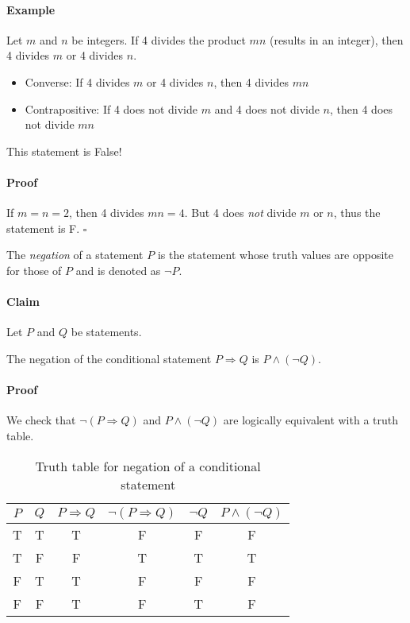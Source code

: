 \documentclass[../main.tex]{subfiles}
\begin{document}
\paragraph{Example}

Let $m$ and $n$ be integers. If 4 divides the product $mn$ (results in an integer),
then 4 divides $m$ or 4 divides $n$.

\begin{itemize}
    \item Converse: If 4 divides $m$ or 4 divides $n$, then 4 divides $mn$
    \item Contrapositive: If 4 does not divide $m$ and 4 does not divide $n$, then 4 does not divide $mn$
\end{itemize}

This statement is False!

\paragraph{Proof}

If $m = n = 2$, then 4 divides $mn = 4$. But 4 does \emph{not} divide $m$ or $n$, thus the 
statement is F. $\square$

The \emph{negation} of a statement $P$ is the statement whose truth values are opposite for those of
$P$ and is denoted as $\neg P$.

\paragraph{Claim} Let $P$ and $Q$ be statements.

The negation of the conditional statement $P \Rightarrow Q$ is $P \land (\neg Q)$.

\paragraph{Proof}
    We check that $\neg(P \Rightarrow Q)$ and $P \land (\neg Q)$ are logically equivalent with a
    truth table.

\begin{table}[ht]
    \centering
    \begin{tabular}{c|c|c|c|c|c}
        $P$ & $Q$ & $P \Rightarrow Q$ & $\neg(P \Rightarrow Q)$ & $\neg Q$ & $P \land (\neg Q)$ \\
        \hline
        T & T & T & F & F & F \\
        T & F & F & T & T & T \\
        F & T & T & F & F & F \\
        F & F & T & F & T & F
    \end{tabular}
    \caption{Truth table for negation of a conditional statement}
\end{table}
\end{document}
